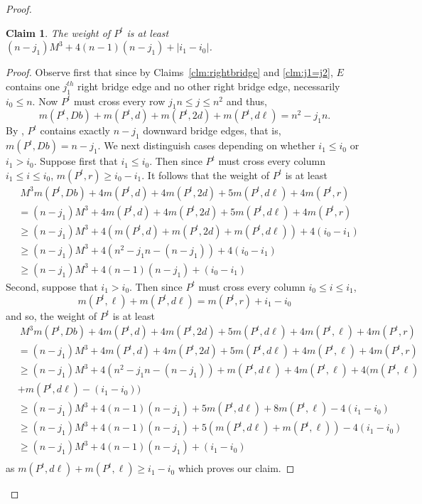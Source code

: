 \documentclass[a4paper,11pt]{article}
\theoremstyle{plain}
\newtheorem{claim}[theorem]{Claim}
\newtheorem{identification rule}{Identification Rule}
\theoremstyle{definition}
\theoremstyle{remark}
\newenvironment{claimproof}{\begin{proof}\renewcommand{\qedsymbol}{\claimqed}}{\end{proof}\renewcommand{\qedsymbol}{\plainqed}}
\let\plainqed\qedsymbol
\newcommand{\claimqed}{$\lrcorner$}
\begin{document}
\begin{proof}
\begin{claim}
\label{clm:weightPt}
The weight of $P^t$ is at least $(n-j_1)M^3 + 4(n-1)(n-j_1) + |i_1 - i_0|$.
\end{claim}

\begin{claimproof}
Observe first that since by Claims~\ref{clm:rightbridge} and \ref{clm:j1=j2}, $E$ contains one $j_1^{th}$ right bridge edge and no other right bridge edge, necessarily $i_0 \leq n$. Now $P^t$ must cross every row $j_1n \leq j \leq n^2$ and thus, 
\[
m(P^t,Db) + m(P^t,d) + m(P^t,2d) + m(P^t,d\ell) = n^2 - j_1n.
\]
By , $P^t$ contains exactly $n-j_1$ downward bridge edges, that is, $m(P^t,Db) = n - j_1$. We next distinguish cases depending on whether $i_1 \leq i_0$ or $i_1 > i_0$. Suppose first that $i_1 \leq i_0$. Then since $P^t$ must cross every column $i_1 \leq i \leq i_0$, $m(P^t,r) \geq i_0 - i_1$. It follows that the weight of $P^t$ is at least 
\begin{equation*}
\begin{split}
&~M^3m(P^t,Db) + 4m(P^t,d) + 4m(P^t,2d) + 5m(P^t,d\ell) + 4m(P^t,r) \\
& = (n-j_1)M^3 + 4m(P^t,d) + 4m(P^t,2d) + 5m(P^t,d\ell) + 4m(P^t,r) \\
& \geq (n-j_1)M^3 + 4(m(P^t,d) + m(P^t,2d) + m(P^t,d\ell)) + 4(i_0 - i_1) \\
& \geq (n-j_1)M^3 + 4(n^2 - j_1n - (n-j_1)) + 4(i_0 - i_1)\\
& \geq (n-j_1)M^3 + 4(n-1)(n-j_1) + (i_0 - i_1)
\end{split}
\end{equation*}
Second, suppose that $i_1 > i_0$. Then since $P^t$ must cross every column $i_0 \leq i \leq i_1$,
\[
m(P^t,\ell) + m(P^t,d\ell) = m(P^t,r) + i_1 - i_0
\]
and so, the weight of $P^t$ is at least
\begin{equation*}
\begin{split}
&~M^3m(P^t,Db) + 4m(P^t,d) + 4m(P^t,2d) + 5m(P^t,d\ell) + 4m(P^t,\ell) + 4m(P^t,r) \\
& = (n-j_1)M^3 + 4m(P^t,d) + 4m(P^t,2d) + 5m(P^t,d\ell) + 4m(P^t,\ell) + 4m(P^t,r) \\
& \geq (n-j_1)M^3 + 4(n^2 - j_1n - (n-j_1)) + m(P^t,d\ell) + 4m(P^t,\ell) + 4(m(P^t,\ell)\\
&+m(P^t,d\ell) - (i_1 - i_0))\\
& \geq (n-j_1)M^3 + 4(n-1)(n-j_1) + 5m(P^t,d\ell) + 8m(P^t,\ell) - 4(i_1 - i_0)\\
& \geq (n-j_1)M^3 + 4(n-1)(n-j_1) + 5(m(P^t,d\ell) + m(P^t,\ell)) - 4(i_1 - i_0)\\
& \geq (n-j_1)M^3 + 4(n-1)(n-j_1) + (i_1 - i_0)\\
\end{split}
\end{equation*}
as $m(P^t,d\ell) + m(P^t,\ell) \geq i_1 - i_0$ which proves our claim.
\end{claimproof}


\end{proof}
\end{document}
